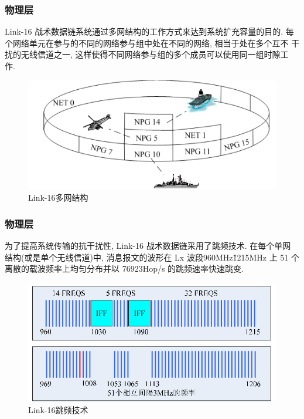 \documentclass[10pt,mathserif]{beamer}%
\begin{document}
\begin{frame}[fragile]
	\frametitle{物理层}
	\setlength{\parindent}{2em}
	\begin{spacing}{1.5}
		Link-16 战术数据链系统通过多网结构的工作方式来达到系统扩充容量的目的.
		每个网络单元在参与的不同的网络参与组中处在不同的网络, 相当于处在多个互不
		干扰的无线信道之一, 这样使得不同网络参与组的多个成员可以使用同一组时隙工
		作. 

		\begin{figure}[htb]
			\centering
			\includegraphics[width=0.8\linewidth]{./images/multi.png}
			\caption{Link-16多网结构}
			\label{Fig:multi}
		\end{figure}
	\end{spacing}
\end{frame}

\begin{frame}[fragile]
	\frametitle{物理层}
	\setlength{\parindent}{2em}
	\begin{spacing}{1.5}
		为了提高系统传输的抗干扰性, Link-16 战术数据链采用了跳频技术. 在每个单网
		结构(或是单个无线信道)中, 消息报文的波形在 Lx 波段960MHz\~1215MHz 上 51
		个离散的载波频率上均匀分布并以 76923Hop/s 的跳频速率快速跳变. 

		\begin{figure}[htb]
			\centering
			\includegraphics[width=0.8\linewidth]{./images/jump.png}
			\caption{Link-16跳频技术}
			\label{Fig:jump}
		\end{figure}
	\end{spacing}
\end{frame}
\end{document}
